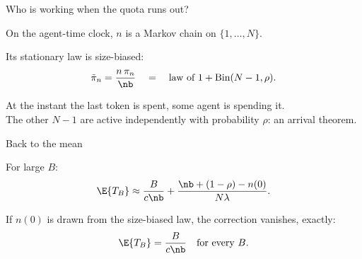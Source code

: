 \begin{frame}{Who is working when the quota runs out?}

	\begin{myitem}
		\item On the agent-time clock, $n$ is a Markov chain on $\{1,\ldots,N\}$.
		\item Its stationary law is \alert{size-biased}:
		\begin{equation*}
			\tilde\pi_n = \frac{n\,\pi_n}{\nb} \quad=\quad \text{law of } 1+\text{Bin}(N-1,\rho).
		\end{equation*}
	\end{myitem}

	\vfill
	\pause

	\begin{block}{}
		\begin{center}
		At the instant the last token is spent, \alert{some agent is spending it}.\\
		The other $N-1$ are active independently with probability $\rho$: an \alert{arrival theorem}.
		\end{center}
	\end{block}
\end{frame}

\begin{frame}{Back to the mean}

	\begin{myitem}
		\item For large $B$:
		\begin{equation*}
			\E{T_B} \approx \frac{B}{c\nb} + \frac{\nb + (1-\rho) - n(0)}{N\lambda}.
		\end{equation*}
		\item<2-> If $n(0)$ is drawn from the size-biased law, the correction vanishes, \alert{exactly}:
		\begin{equation*}
			\E{T_B} = \frac{B}{c\nb}\quad\text{for every } B.
		\end{equation*}
	\end{myitem}
\end{frame}
